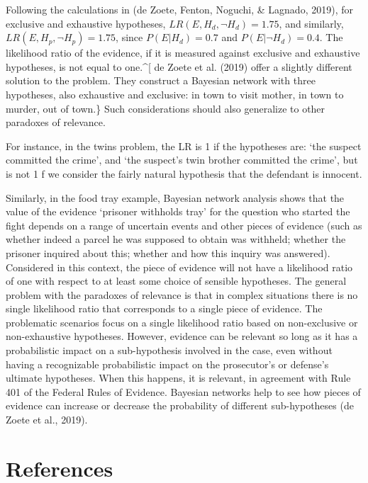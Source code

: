 \documentclass[10pt,dvipsnames,enabledeprecatedfontcommands]{scrartcl}
\begin{document}
\noindent
 Following the calculations in (de Zoete, Fenton, Noguchi, \& Lagnado,
2019), for exclusive and exhaustive hypotheses,
\(LR(E,H_d,\neg H_d)=1.75\), and similarly,
\(LR(E,H_p, \neg H_p)=1.75\), since \(P(E\vert H_d)=0.7\) and
\(P(E\vert \neg H_d)=0.4\). The likelihood ratio of the evidence, if it
is measured against exclusive and exhaustive hypotheses, is not equal to
one.\^{}{[} de Zoete et al. (2019) offer a slightly different solution
to the problem. They construct a Bayesian network with three hypotheses,
also exhaustive and exclusive: in town to visit mother, in town to
murder, out of town.\} Such considerations should also generalize to
other paradoxes of relevance.

For instance, in the twins problem, the LR is 1 if the hypotheses are:
`the suspect committed the crime', and `the suspect's twin brother
committed the crime', but is not 1 f we consider the fairly natural
hypothesis that the defendant is innocent.

Similarly, in the food tray example, Bayesian network analysis shows
that the value of the evidence `prisoner withholds tray' for the
question who started the fight depends on a range of uncertain events
and other pieces of evidence (such as whether indeed a parcel he was
supposed to obtain was withheld; whether the prisoner inquired about
this; whether and how this inquiry was answered). Considered in this
context, the piece of evidence will not have a likelihood ratio of one
with respect to at least some choice of sensible hypotheses. The general
problem with the paradoxes of relevance is that in complex situations
there is no single likelihood ratio that corresponds to a single piece
of evidence. The problematic scenarios focus on a single likelihood
ratio based on non-exclusive or non-exhaustive hypotheses. However,
evidence can be relevant so long as it has a probabilistic impact on a
sub-hypothesis involved in the case, even without having a recognizable
probabilistic impact on the prosecutor's or defense's ultimate
hypotheses. When this happens, it is relevant, in agreement with Rule
401 of the Federal Rules of Evidence. Bayesian networks help to see how
pieces of evidence can increase or decrease the probability of different
sub-hypotheses (de Zoete et al., 2019).

\section*{References}\label{references}
\end{document}
